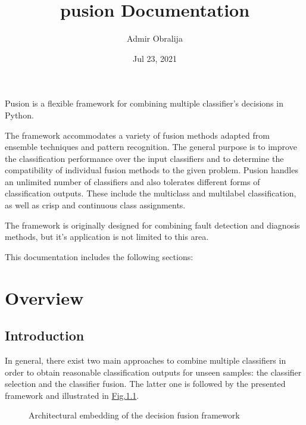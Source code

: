 \documentclass[letterpaper,10pt,english]{sphinxmanual}
\title{pusion Documentation}
\date{Jul 23, 2021}
\author{Admir Obralija}
\begin{document}
\pagestyle{empty}
\sphinxmaketitle
\pagestyle{plain}
\sphinxtableofcontents
\pagestyle{normal}
\label{\detokenize{index::doc}}


\sphinxAtStartPar
Pusion is a flexible framework for combining multiple classifier’s decisions in Python.

\sphinxAtStartPar
The framework accommodates a variety of fusion methods adapted from ensemble techniques and pattern recognition.
The general purpose is to improve the classification performance over the input classifiers and to determine the
compatibility of individual fusion methods to the given problem.
Pusion handles an unlimited number of classifiers and also tolerates different forms of classification outputs.
These include the multiclass and multilabel classification, as well as crisp and continuous class assignments.

\sphinxAtStartPar
The framework is originally designed for combining fault detection and diagnosis methods, but it’s application is not
limited to this area.

\sphinxAtStartPar
This documentation includes the following sections:


\chapter{Overview}
\label{\detokenize{overview:overview}}\label{\detokenize{overview::doc}}

\section{Introduction}
\label{\detokenize{overview:introduction}}
\sphinxAtStartPar
In general, there exist two main approaches to combine multiple classifiers in order to obtain reasonable classification
outputs for unseen samples: the classifier selection and the classifier fusion.
The latter one is followed by the presented framework and illustrated in \hyperref[\detokenize{overview:fig-context}]{Fig.\@ \ref{\detokenize{overview:fig-context}}}.

\begin{figure}[htbp]
\centering
\capstart

\noindent{}
\caption{Architectural embedding of the decision fusion framework}\label{\detokenize{overview:id1}}\label{\detokenize{overview:fig-context}}\end{figure}
\end{document}
